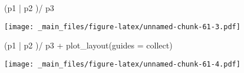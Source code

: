 \documentclass[
]{book}
\newenvironment{Shaded}{\begin{snugshade}}{\end{snugshade}}
\newcommand{\AttributeTok}[1]{\textcolor[rgb]{0.77,0.63,0.00}{#1}}
\newcommand{\FunctionTok}[1]{\textcolor[rgb]{0.00,0.00,0.00}{#1}}
\newcommand{\NormalTok}[1]{#1}
\newcommand{\SpecialCharTok}[1]{\textcolor[rgb]{0.00,0.00,0.00}{#1}}
\newcommand{\StringTok}[1]{\textcolor[rgb]{0.31,0.60,0.02}{#1}}
\begin{document}
\begin{Shaded}
\begin{Highlighting}[]
\NormalTok{(p1 }\SpecialCharTok{|}\NormalTok{ p2 )}\SpecialCharTok{/}\NormalTok{ p3}
\end{Highlighting}
\end{Shaded}

\texttt{[image: \_main\_files/figure-latex/unnamed-chunk-61-3.pdf]}

\begin{Shaded}
\begin{Highlighting}[]
\NormalTok{(p1 }\SpecialCharTok{|}\NormalTok{ p2 )}\SpecialCharTok{/}\NormalTok{ p3 }\SpecialCharTok{+} \FunctionTok{plot\_layout}\NormalTok{(}\AttributeTok{guides =} \StringTok{\textquotesingle{}collect\textquotesingle{}}\NormalTok{)}
\end{Highlighting}
\end{Shaded}

\texttt{[image: \_main\_files/figure-latex/unnamed-chunk-61-4.pdf]}
\end{document}
